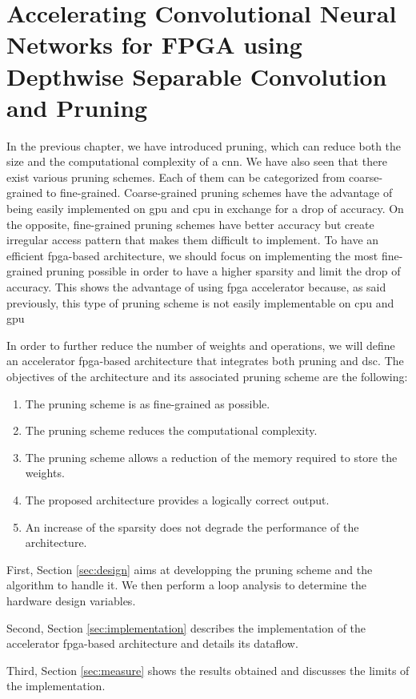 \chapter{Accelerating Convolutional Neural Networks for FPGA using Depthwise Separable Convolution and Pruning} \label{chap:pratique}
%
%
In the previous chapter, we have introduced pruning, which can reduce both the size and the computational complexity of a \acrshort{cnn}. We have also seen that there exist various pruning schemes. Each of them can be categorized from coarse-grained to fine-grained. Coarse-grained pruning schemes have the advantage of being easily implemented on \acrshort{gpu} and \acrshort{cpu} in exchange for a drop of accuracy. On the opposite, fine-grained pruning schemes have better accuracy but create irregular access pattern that makes them difficult to implement. To have an efficient \acrshort{fpga}-based architecture, we should focus on implementing the most fine-grained pruning possible in order to have a higher sparsity and limit the drop of accuracy. This shows the advantage of using \acrshort{fpga} accelerator because, as said previously, this type of pruning scheme is not easily implementable on \acrshort{cpu} and \acrshort{gpu}

In order to further reduce the number of weights and operations, we will define an accelerator \acrshort{fpga}-based architecture that integrates both pruning and \acrshort{dsc}. The objectives of the architecture and its associated pruning scheme are the following:
%
\begin{enumerate}
    \item The pruning scheme is as fine-grained as possible.
    \item The pruning scheme reduces the computational complexity.
    \item The pruning scheme allows a reduction of the memory required to store the weights.
    \item The proposed architecture provides a logically correct output.
    \item An increase of the sparsity does not degrade the performance of the architecture.
\end{enumerate}
%
First, Section \ref{sec:design} aims at developping the pruning scheme and the algorithm to handle it. We then perform a loop analysis to determine the hardware design variables.

Second, Section \ref{sec:implementation} describes the implementation of the accelerator \acrshort{fpga}-based architecture and details its dataflow.

Third, Section \ref{sec:measure} shows the results obtained and discusses the limits of the implementation.
%
%

%
%

%
%

%
%
\afterpage{\blankpage}
\cleardoublepage
\newpage
